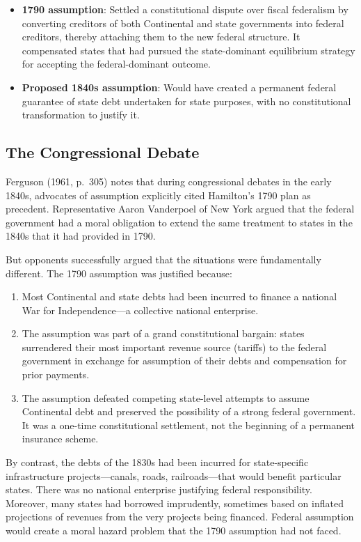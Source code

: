 \documentclass[12pt]{article}
\begin{document}
\begin{itemize}
\item \textbf{1790 assumption}: Settled a constitutional dispute over fiscal federalism by converting creditors of both Continental and state governments into federal creditors, thereby attaching them to the new federal structure. It compensated states that had pursued the state-dominant equilibrium strategy for accepting the federal-dominant outcome.

\item \textbf{Proposed 1840s assumption}: Would have created a permanent federal guarantee of state debt undertaken for state purposes, with no constitutional transformation to justify it.
\end{itemize}

\subsection{The Congressional Debate}

Ferguson (1961, p.~305) notes that during congressional debates in the early 1840s, advocates of assumption explicitly cited Hamilton's 1790 plan as precedent. Representative Aaron Vanderpoel of New York argued that the federal government had a moral obligation to extend the same treatment to states in the 1840s that it had provided in 1790.

But opponents successfully argued that the situations were fundamentally different. The 1790 assumption was justified because:

\begin{enumerate}
\item Most Continental and state debts had been incurred to finance a national War for Independence---a collective national enterprise.

\item The assumption was part of a grand constitutional bargain: states surrendered their most important revenue source (tariffs) to the federal government in exchange for assumption of their debts and compensation for prior payments.

\item The assumption defeated competing state-level attempts to assume Continental debt and preserved the possibility of a strong federal government. It was a one-time constitutional settlement, not the beginning of a permanent insurance scheme.
\end{enumerate}

By contrast, the debts of the 1830s had been incurred for state-specific infrastructure projects---canals, roads, railroads---that would benefit particular states. There was no national enterprise justifying federal responsibility. Moreover, many states had borrowed imprudently, sometimes based on inflated projections of revenues from the very projects being financed. Federal assumption would create a moral hazard problem that the 1790 assumption had not faced.
\end{document}

